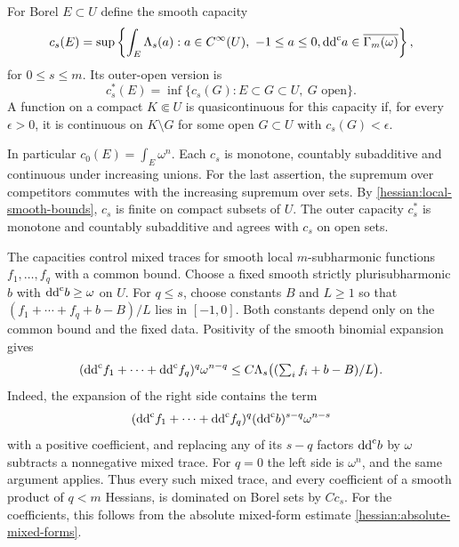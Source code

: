 \begin{definition}\label{hessian:smooth-local-capacity}
For Borel $E\subset U$ define the smooth capacity
\[
 c_s(E)=\sup\left\{\int_E \Lambda_s(a):
        a\in C^\infty(U),\ -1\leq a\leq0,
        \mathrm{dd}^{\mathrm{c}} a\in\overline{\Gamma_m(\omega)}\right\},
\]
for $0\leq s\leq m$. Its outer-open version is
\[
 c_s^*(E)=\inf\{c_s(G):E\subset G\subset U,\ G\text{ open}\}.
\]
A function on a compact $K\Subset U$ is quasicontinuous
for this capacity if, for every $\epsilon>0$, it is continuous on
$K\setminus G$ for some open $G\subset U$ with $c_s(G)<\epsilon$.
\end{definition}

In particular $c_0(E)=\int_E\omega^n$. Each $c_s$ is monotone,
countably subadditive and continuous under increasing unions.
For the last assertion, the supremum over competitors commutes with
the increasing supremum over sets. By
\cref{hessian:local-smooth-bounds}, $c_s$ is finite on compact
subsets of $U$. The outer capacity $c_s^*$ is monotone
and countably subadditive and agrees with $c_s$ on open sets.

The capacities control mixed traces for smooth local $m$-subharmonic functions
$f_1,\ldots,f_q$ with a common bound. Choose a fixed smooth strictly
plurisubharmonic $b$ with $\mathrm{dd}^{\mathrm{c}} b\geq\omega$ on $U$. For $q\leq s$,
choose constants $B$ and $L\geq1$ so that
$(f_1+\cdots+f_q+b-B)/L$ lies in $[-1,0]$.
Both constants depend only on the common bound and the fixed data.
Positivity of the smooth binomial expansion gives
\begin{equation}\label{eq:hessian:smooth-capacity-bound}
 (\mathrm{dd}^{\mathrm{c}} f_1+\cdots+\mathrm{dd}^{\mathrm{c}} f_q)^q\omega^{n-q}
       \leq C \Lambda_s\bigl((\textstyle\sum_i f_i+b-B)/L\bigr).
\end{equation}
Indeed, the expansion of the right side contains the term
\[
 (\mathrm{dd}^{\mathrm{c}} f_1+\cdots+\mathrm{dd}^{\mathrm{c}} f_q)^q(\mathrm{dd}^{\mathrm{c}} b)^{s-q}\omega^{n-s}
\]
with a positive coefficient, and replacing any of its $s-q$ factors
$\mathrm{dd}^{\mathrm{c}} b$ by $\omega$ subtracts a nonnegative mixed trace.
For $q=0$ the left side is $\omega^n$, and the same argument applies.
Thus every such mixed trace, and every coefficient of a smooth
product of $q<m$ Hessians, is dominated on Borel sets by $C c_s$.
For the coefficients, this follows from the absolute mixed-form
estimate \cref{hessian:absolute-mixed-forms}.

